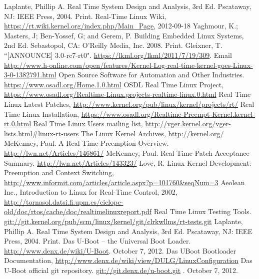 
\begin{thebibliography}{9}

Laplante, Phillip A. Real Time System Design and Analysis, 3rd Ed. Pscataway, NJ: IEEE Press, 2004. Print.
Real-Time Linux Wiki, \url{https://rt.wiki.kernel.org/index.php/Main_Page}, 2012-09-18
Yaghmour, K.; Masters, J; Ben-Yossef, G; and Gerem, P. Building Embedded Linux Systems, 2nd Ed. Sebastopol, CA: O'Reilly Media, Inc. 2008. Print.
Gleixner, T. ``[ANNOUNCE] 3.0-rc7-rt0". \url{https://lkml.org/lkml/2011/7/19/309}. Email
\url{http://www.h-online.com/open/features/Kernel-Log-real-time-kernel-goes-Linux-3-0-1382791.html}
Open Source Software for Automation and Other Industries. \url{https://www.osadl.org/Home.1.0.html}
OSDL Real Time Linux Project, \url{https://www.osadl.org/Realtime-Linux.projects-realtime-linux.0.html}
Real Time Linux Latest Patches, \url{http://www.kernel.org/pub/linux/kernel/projects/rt/}
Real Time Linux Installation, \url{https://www.osadl.org/Realtime-Preempt-Kernel.kernel-rt.0.html}
Real Time Linux Users mailing list, \url{http://vger.kernel.org/vger-lists.html#linux-rt-users}
The Linux Kernel Archives, \url{http://kernel.org/}
McKenney, Paul. A Real Time Preemption Overview. \url{http://lwn.net/Articles/146861/}
McKenney, Paul. Real Time Patch Acceptance Summary. \url{http://lwn.net/Articles/143323/}
Love, R. Linux Kernel Development: Preemption and Context Switching, \url{http://www.informit.com/articles/article.aspx?p=101760&seqNum=3}
Aeolean Inc., Introduction to Linux for Real-Time Control, 2002, \url{http://tornasol.datsi.fi.upm.es/ciclope-old/doc/rtos/cache/doc/realtimelinuxreport.pdf}
Real Time Linux Testing Tools. \url{git://git.kernel.org/pub/scm/linux/kernel/git/clrkwllms/rt-tests.git}
Laplante, Phillip A. Real Time System Design and Analysis, 3rd Ed. Pscataway, NJ: IEEE Press, 2004. Print.
Das U-Boot -- the Universal Boot Loader. \url{http://www.denx.de/wiki/U-Boot}. October 7, 2012.
Das UBoot Bootloader Documentation, \url{http://www.denx.de/wiki/view/DULG/LinuxConfiguration}
Das U-Boot official git repository. \url{git://git.denx.de/u-boot.git} . October 7, 2012.

\end{thebibliography}
